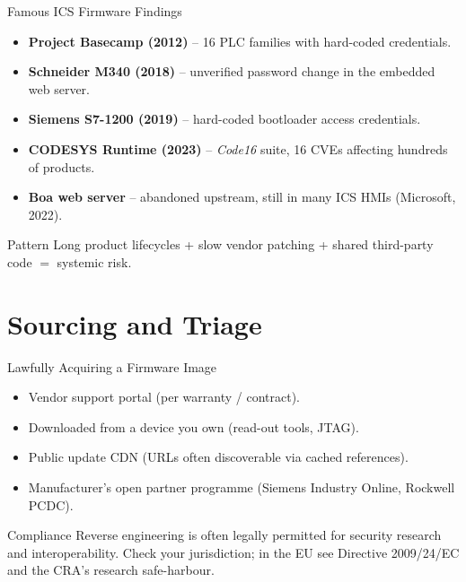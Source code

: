 \documentclass[aspectratio=169,11pt]{beamer}
\begin{document}
\begin{frame}{Famous ICS Firmware Findings}
\begin{itemize}
  \item \textbf{Project Basecamp (2012)} -- 16 PLC families with hard-coded credentials.
  \item \textbf{Schneider M340 (2018)} -- unverified password change in the embedded web server.
  \item \textbf{Siemens S7-1200 (2019)} -- hard-coded bootloader access credentials.
  \item \textbf{CODESYS Runtime (2023)} -- \emph{Code16} suite, 16 CVEs affecting hundreds of products.
  \item \textbf{Boa web server} -- abandoned upstream, still in many ICS HMIs (Microsoft, 2022).
\end{itemize}
\begin{notebox}{Pattern}
Long product lifecycles + slow vendor patching + shared third-party code $=$ systemic risk.
\end{notebox}
\end{frame}

\section{Sourcing and Triage}

\begin{frame}{Lawfully Acquiring a Firmware Image}
\begin{itemize}
  \item Vendor support portal (per warranty / contract).
  \item Downloaded from a device you own (read-out tools, JTAG).
  \item Public update CDN (URLs often discoverable via cached references).
  \item Manufacturer's open partner programme (Siemens Industry Online, Rockwell PCDC).
\end{itemize}
\begin{warnbox}{Compliance}
Reverse engineering is often legally permitted for security research and interoperability. Check your jurisdiction; in the EU see Directive 2009/24/EC and the CRA's research safe-harbour.
\end{warnbox}
\end{frame}
\end{document}
